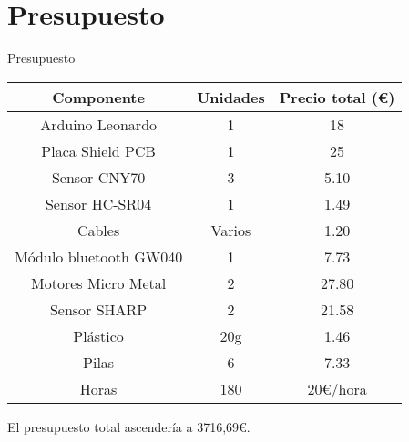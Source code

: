 \documentclass{beamer}
\begin{document}
\section{Presupuesto}
\begin{frame}{Presupuesto}
	\begin{table}[htbp]
		\begin{center}
			\begin{tabular}{|c|c|c|}
				\hline 
				\textbf{Componente} & \textbf{Unidades} & \textbf{Precio total (\euro)}  \\
				\hline
				Arduino Leonardo & 1 & 18 \\\hline
				Placa Shield PCB & 1 & 25 \\\hline
				Sensor CNY70 & 3 & 5.10 \\\hline
				Sensor HC-SR04 & 1 & 1.49 \\\hline
				Cables & Varios & 1.20 \\\hline
				Módulo bluetooth GW040 & 1 & 7.73 \\\hline
				Motores Micro Metal & 2 & 27.80 \\\hline
				Sensor SHARP & 2 & 21.58 \\\hline
				Plástico & 20g & 1.46 \\\hline
				Pilas & 6 & 7.33 \\\hline
				Horas & 180 & 20€/hora \\\hline
			\end{tabular}
		\end{center}
	\end{table}	
	El presupuesto total ascendería a 3716,69\euro.
\end{frame}
\end{document}
